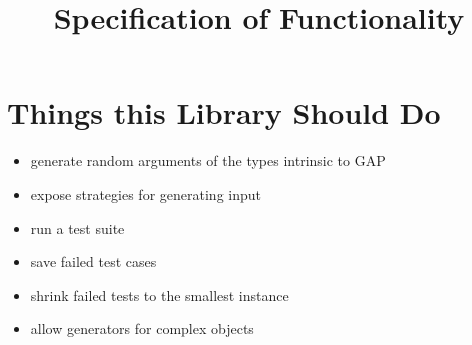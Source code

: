\documentclass[a4paper]{article}
\title{Specification of Functionality}
\begin{document}
\section*{Things this Library Should Do}

\begin{itemize}
  \item generate random arguments of the types intrinsic to GAP
  \item expose strategies for generating input
  \item run a test suite
  \item save failed test cases
  \item shrink failed tests to the smallest instance
  \item allow generators for complex objects
\end{itemize}
\end{document}
